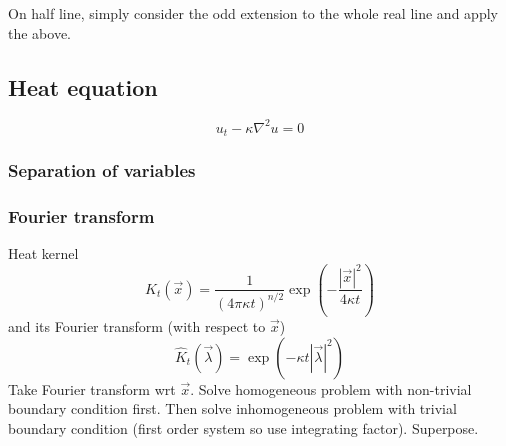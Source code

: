 \documentclass{article}
\theoremstyle{definition}
\theoremstyle{remark}
\theoremstyle{plain}
\theoremstyle{definition}
\begin{document}
On half line, simply consider the odd extension to the whole real line and apply the above.
\subsection{Heat equation}
\[u_t-\kappa\nabla^2 u=0\]
\subsubsection{Separation of variables}
\subsubsection{Fourier transform}
Heat kernel
\[K_t(\vec x)=\dfrac{1}{(4\pi\kappa t)^{n/2}}\exp\left(-\dfrac{|\vec x|^2}{4\kappa t}\right)\]
and its Fourier transform (with respect to $\vec x$)
\[\hat K_t(\vec\lambda)=\exp\left(-\kappa t|\vec\lambda|^2\right)\]
Take Fourier transform wrt $\vec x$. Solve homogeneous problem with non-trivial boundary condition first. Then solve inhomogeneous problem with trivial boundary condition (first order system so use integrating factor). Superpose.
\end{document}
